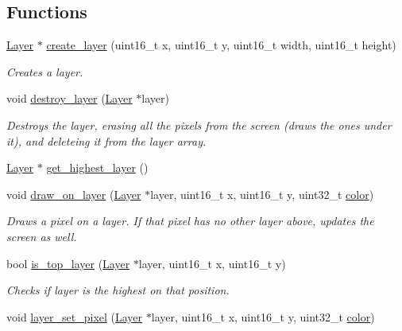 \subsection*{Functions}
\begin{DoxyCompactItemize}
\item 
\mbox{\hyperlink{struct_layer}{Layer}} $\ast$ \mbox{\hyperlink{group__layer_gae7f68548d31f2961ac68df03e53558c2}{create\+\_\+layer}} (uint16\+\_\+t x, uint16\+\_\+t y, uint16\+\_\+t width, uint16\+\_\+t height)
\begin{DoxyCompactList}\small\item\em Creates a layer. \end{DoxyCompactList}\item 
void \mbox{\hyperlink{group__layer_gae89d557f21d9465ba7372ff23cf05ae9}{destroy\+\_\+layer}} (\mbox{\hyperlink{struct_layer}{Layer}} $\ast$layer)
\begin{DoxyCompactList}\small\item\em Destroys the layer, erasing all the pixels from the screen (draws the ones under it), and deleteing it from the layer array. \end{DoxyCompactList}\item 
\mbox{\hyperlink{struct_layer}{Layer}} $\ast$ \mbox{\hyperlink{group__layer_gaec705a8cfd8cc0d79ef36fa4f47da621}{get\+\_\+highest\+\_\+layer}} ()
\item 
void \mbox{\hyperlink{group__layer_ga04dfe9a97af5089a6b5a5a044d8d7e9c}{draw\+\_\+on\+\_\+layer}} (\mbox{\hyperlink{struct_layer}{Layer}} $\ast$layer, uint16\+\_\+t x, uint16\+\_\+t y, uint32\+\_\+t \mbox{\hyperlink{structcolor}{color}})
\begin{DoxyCompactList}\small\item\em Draws a pixel on a layer. If that pixel has no other layer above, updates the screen as well. \end{DoxyCompactList}\item 
bool \mbox{\hyperlink{group__layer_ga3eef68dc1d9d6086e747506f82a4eb11}{is\+\_\+top\+\_\+layer}} (\mbox{\hyperlink{struct_layer}{Layer}} $\ast$layer, uint16\+\_\+t x, uint16\+\_\+t y)
\begin{DoxyCompactList}\small\item\em Checks if layer is the highest on that position. \end{DoxyCompactList}\item 
void \mbox{\hyperlink{group__layer_ga8bd4001df9f278c1b60a0a7732deef83}{layer\+\_\+set\+\_\+pixel}} (\mbox{\hyperlink{struct_layer}{Layer}} $\ast$layer, uint16\+\_\+t x, uint16\+\_\+t y, uint32\+\_\+t \mbox{\hyperlink{structcolor}{color}})

\end{DoxyCompactItemize}
